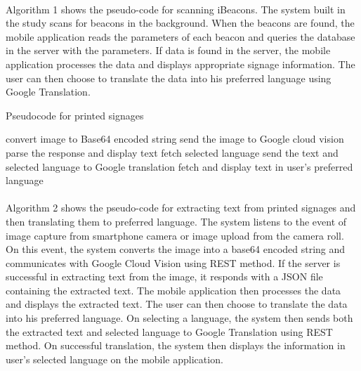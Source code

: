 \documentclass[12pt]{article}
\begin{document}
\paragraph{}Algorithm 1 shows the pseudo-code for scanning iBeacons. The system built in the study scans for beacons in the background. When the beacons are found, the mobile application reads the parameters of each beacon and queries the database in the server with the parameters. If data is found in the server, the mobile application processes the data and displays appropriate signage information. The user can then choose to translate the data into his preferred language using Google Translation.


\begin{algorithm}
\caption{Pseudocode for printed signages}\label{euclid}
\begin{algorithmic}[1]
\State convert image to Base64 encoded string
\State send the image to Google cloud vision 
\State 	parse the response and display text
	\State fetch selected language
	\State send the text and selected language to Google translation
	\State fetch and display text in user's preferred language
\EndProcedure
\EndIf
\EndProcedure
\end{algorithmic}
\end{algorithm}

\paragraph{} Algorithm 2 shows the pseudo-code for extracting text from printed signages and then translating them to preferred language. The system listens to the event of image capture from smartphone camera or image upload from the camera roll. On this event, the system converts the image into a base64 encoded string and communicates with Google Cloud Vision using REST method. If the server is successful in extracting text from the image, it responds with a JSON file containing the extracted text. The mobile application then processes the data and displays the extracted text. The user can then choose to translate the data into his preferred language. On selecting a language, the system then sends both the extracted text and selected language to Google Translation using REST method. On successful translation, the system then displays the information in user's selected language on the mobile application.
\end{document}
